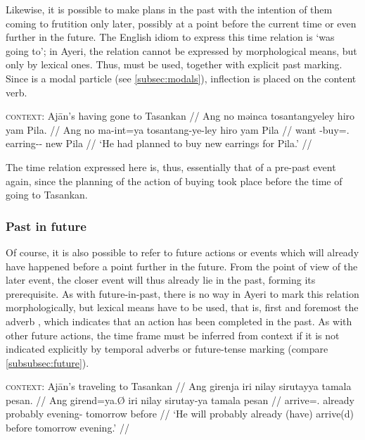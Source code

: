 Likewise, it is possible to make plans in the past with the intention of them 
coming to frutition only later, possibly at a point before the current time or 
even further in the future. The English idiom to express this time relation is 
`was going to'; in Ayeri, the relation cannot be expressed by morphological 
means, but only by lexical ones. Thus,  must 
be used, together with explicit past marking. Since  is a modal 
particle (see \autoref{subsec:modals}), inflection is placed on the content 
verb.

\ex
\begingl
	\glpreamble \textsc{context}: Ajān's having gone to Tasankan //
	\gla Ang no məinca tosantangyeley hiro yam Pila. //
	\glb Ang no ma-int=ya tosantang-ye-ley hiro yam Pila //
	\glc \AgtT{} want \Pst{}-buy=\TsgM{}.\Top{} earring-\Pl{}-\PargI{} new 
		\Dat{} Pila //
	\glft `He had planned to buy new earrings for Pila.' //
\endgl
\xe

The time relation expressed here is, thus, essentially that of a pre-past 
event again, since the planning of the action of buying took place before 
the time of going to Tasankan.


\subsubsection{Past in future}

Of course, it is also possible to refer to future actions or events which will
already have happened before a point further in the future. From the point of
view of the later event, the closer event will thus already lie in the past,
forming its prerequisite. As with future-in-past, there is no way in Ayeri to
mark this relation morphologically, but lexical means have to be used, that is,
first and foremost the adverb , which indicates that an
action has been completed in the past. As with other future actions, the time
frame must be inferred from context if it is not indicated explicitly by
temporal adverbs or future-tense marking (compare
\autoref{subsubsec:future}).

\ex
\begingl
	\glpreamble \textsc{context}: Ajān's traveling to Tasankan //
	\gla Ang girenja iri nilay sirutayya tamala pesan. //
	\glb Ang girend=ya.Ø iri nilay sirutay-ya tamala pesan //
	\glc \AgtT{} arrive=\TsgM{}.\Top{} already 
		probably evening-\Loc{} tomorrow before //
	\glft `He will probably already (have) arrive(d) before 
		tomorrow evening.' //
\endgl
\xe

